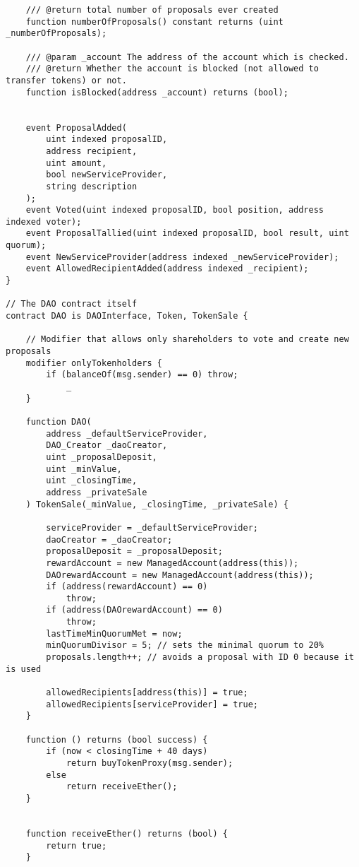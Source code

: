 \documentclass[9pt,oneside]{amsart}
\begin{document}
\begin{appendix}
\begin{verbatim}
    /// @return total number of proposals ever created
    function numberOfProposals() constant returns (uint _numberOfProposals);

    /// @param _account The address of the account which is checked.
    /// @return Whether the account is blocked (not allowed to transfer tokens) or not.
    function isBlocked(address _account) returns (bool);


    event ProposalAdded(
        uint indexed proposalID,
        address recipient,
        uint amount,
        bool newServiceProvider,
        string description
    );
    event Voted(uint indexed proposalID, bool position, address indexed voter);
    event ProposalTallied(uint indexed proposalID, bool result, uint quorum);
    event NewServiceProvider(address indexed _newServiceProvider);
    event AllowedRecipientAdded(address indexed _recipient);
}

// The DAO contract itself
contract DAO is DAOInterface, Token, TokenSale {

    // Modifier that allows only shareholders to vote and create new proposals
    modifier onlyTokenholders {
        if (balanceOf(msg.sender) == 0) throw;
            _
    }

    function DAO(
        address _defaultServiceProvider,
        DAO_Creator _daoCreator,
        uint _proposalDeposit,
        uint _minValue,
        uint _closingTime,
        address _privateSale
    ) TokenSale(_minValue, _closingTime, _privateSale) {

        serviceProvider = _defaultServiceProvider;
        daoCreator = _daoCreator;
        proposalDeposit = _proposalDeposit;
        rewardAccount = new ManagedAccount(address(this));
        DAOrewardAccount = new ManagedAccount(address(this));
        if (address(rewardAccount) == 0)
            throw;
        if (address(DAOrewardAccount) == 0)
            throw;
        lastTimeMinQuorumMet = now;
        minQuorumDivisor = 5; // sets the minimal quorum to 20%
        proposals.length++; // avoids a proposal with ID 0 because it is used

        allowedRecipients[address(this)] = true;
        allowedRecipients[serviceProvider] = true;
    }

    function () returns (bool success) {
        if (now < closingTime + 40 days)
            return buyTokenProxy(msg.sender);
        else
            return receiveEther();
    }


    function receiveEther() returns (bool) {
        return true;
    }



\end{verbatim}
\end{appendix}
\end{document}
